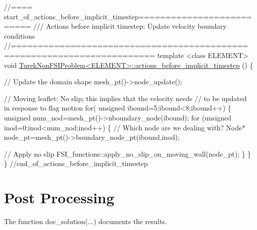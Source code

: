 \begin{DoxyCodeInclude}
\textcolor{comment}{//==== start\_of\_actions\_before\_implicit\_timestep==========================}
\textcolor{comment}{/// Actions before implicit timestep: Update velocity boundary conditions}
\textcolor{comment}{}\textcolor{comment}{//========================================================================}
\textcolor{keyword}{template} <\textcolor{keyword}{class} ELEMENT> 
\textcolor{keywordtype}{void} \hyperlink{classTurekNonFSIProblem_a29725cde9071c3a83792469787ea6c7d}{TurekNonFSIProblem<ELEMENT>::actions\_before\_implicit\_timestep}
      ()
\{

 \textcolor{comment}{// Update the domain shape}
 mesh\_pt()->node\_update();

 \textcolor{comment}{// Moving leaflet: No slip; this implies that the velocity needs}
 \textcolor{comment}{// to be updated in response to flag motion}
 \textcolor{keywordflow}{for}( \textcolor{keywordtype}{unsigned} ibound=5;ibound<8;ibound++)
  \{
   \textcolor{keywordtype}{unsigned} num\_nod=mesh\_pt()->nboundary\_node(ibound);
   \textcolor{keywordflow}{for} (\textcolor{keywordtype}{unsigned} inod=0;inod<num\_nod;inod++)
    \{
     \textcolor{comment}{// Which node are we dealing with?}
     Node* node\_pt=mesh\_pt()->boundary\_node\_pt(ibound,inod);
     
     \textcolor{comment}{// Apply no slip}
     FSI\_functions::apply\_no\_slip\_on\_moving\_wall(node\_pt);
    \}
  \}
\} \textcolor{comment}{//end\_of\_actions\_before\_implicit\_timestep}

\end{DoxyCodeInclude}




 

\hypertarget{index_doc}{}\section{Post Processing}\label{index_doc}
The function doc\+\_\+solution(...) documents the results.


